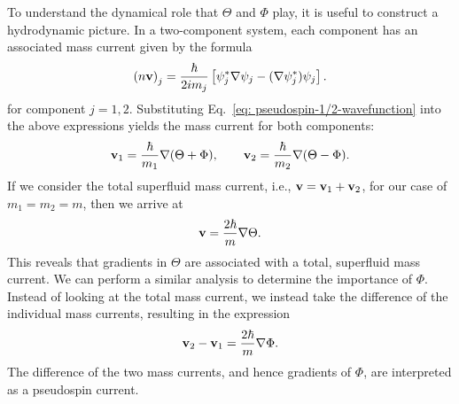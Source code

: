 To understand the dynamical role that \(\Theta \) and \(\Phi \) play, it is
useful to construct a hydrodynamic picture.
In a two-component system, each component has an associated mass current given
by the formula
\begin{equation}
    {(n\vb{v})}_j=\frac{\hbar}{2im_j}
    \left[\psi_j^*\nabla\psi_j-(\nabla\psi_j^*)\psi_j\right].
    \label{eq: two-comp-mass-current}
\end{equation}
for component \(j=1,2\).
Substituting Eq.~\eqref{eq: pseudospin-1/2-wavefunction} into the above
expressions yields the mass current for both components:
\begin{equation}
    \vb{v}_1 = \frac{\hbar}{m_1}\nabla(\Theta + \Phi), \qquad
    \vb{v}_2 = \frac{\hbar}{m_2}\nabla(\Theta - \Phi).
\end{equation}
If we consider the total superfluid mass current, i.e.,
\(\vb{v} = \vb{v}_1 + \vb{v}_2\), for our case of \(m_1=m_2=m\), then we arrive
at
\begin{equation}
    \vb{v} = \frac{2\hbar}{m}\nabla\Theta.
    \label{eq: two-comp-velocity}
\end{equation}
This reveals that gradients in \(\Theta \) are associated with a total,
superfluid mass current.
We can perform a similar analysis to determine the importance of \(\Phi \).
Instead of looking at the total mass current, we instead take the difference
of the individual mass currents, resulting in the expression
\begin{equation}
    \vb{v}_2 - \vb{v}_1 = \frac{2\hbar}{m}\nabla\Phi.
\end{equation}
The difference of the two mass currents, and hence gradients of \(\Phi \), are
interpreted as a pseudospin current.

